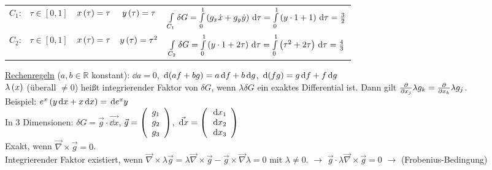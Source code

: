\setlength{\tabcolsep}{5pt}
\renewcommand{\arraystretch}{1}
\begin{table}[H]
  \centering
  \begin{tabular}{c c c c c}
    $C_1$:&$\tau\in [0,1]$&$x\left( \tau \right) =\tau$&$y\left( \tau \right)=\tau$&$\int\limits_{C_1}\delta G = \int\limits_0^1 \left( g_x \dot{x} + g_y \dot{y} \right)\,\text d{\tau} = \int\limits_0^1 \left( y\cdot 1+1 \right)\,\text d{\tau} = \frac32$\\
    $C_2$:&$\tau\in [0,1]$&$x\left( \tau \right) = \tau$&$y\left( \tau \right) = \tau^2$&$\int\limits_{C_2}\delta G = \int\limits_0^1 \left( y\cdot 1 + 2\tau \right)\,\text d{\tau} = \int\limits_0^1\left( \tau^2+2\tau \right)\,\text d{\tau} = \frac43$
  \end{tabular}
\end{table}

\uline{Rechenregeln} ($a,b\in \mathds{R}$ konstant): $\dd{a} = 0$, $\,\text d{\left( a f + b g \right)} = a\,\text d{f} + b \,\text d{g}$, $\,\text d{\left( fg \right)} =g\,\text d{f} + f\,\text d{g}$\\
$\lambda\left( x \right)$ (überall $\neq 0$) heißt integrierender Faktor von $\delta G$, wenn $\lambda \delta G$ ein exaktes Differential ist. Dann gilt $\frac{\partial }{\partial x_j}\lambda g_k = \frac{\partial }{\partial x_k}\lambda g_j$.\\
Beispiel: $e^{x}\left( y \,\text d{x} + x\,\text d{x} \right) = \,\text d{e^x y}$\\
In $3$ Dimensionen: $\delta G = \vec{g}\cdot\vec{\dd{x}}$,
$\vec{g} = \left( \begin{array}{c} g_1\\g_2\\g_3\end{array} \right)$,
$\vec{\,\text d{x}} = \left( \begin{array}{c}\,\text d{x_1}\\ \,\text d{x_2}\\ \,\text d{x_3}\end{array} \right)$\\
Exakt, wenn $\vec{\nabla}\times \vec{g} = 0$.\\
Integrierender Faktor existiert, wenn $\vec{\nabla}\times \lambda \vec{g} = \lambda\vec{\nabla}\times \vec{g} - \vec{g}\times\vec{\nabla}\lambda = 0$ mit $\lambda \neq 0$. $\rightarrow$ $\vec{g}\cdot\lambda\vec{\nabla}\times\vec{g} = 0$ $\rightarrow$  (Frobenius-Bedingung)


